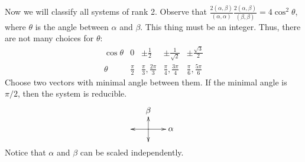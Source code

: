  Now we will classify all systems of rank 2. Observe that
 $\frac{2(\alpha,\beta)}{(\alpha,\alpha)}\frac{2(\alpha,\beta)}{(\beta,\beta)} =
 4\cos^2 \theta$, where $\theta$ is the angle between $\alpha$ and
 $\beta$. This thing must be an integer. Thus, there are not many choices for
 $\theta$:
 \[\begin{array}{c|ccccc}
   \cos \theta & 0 & \pm \frac{1}{2} & \pm \frac{1}{\sqrt{2}} & \pm
   \frac{\sqrt{3}}{2}\\ \hline
   \theta & \frac{\pi}{2} & \frac{\pi}{3}, \frac{2\pi}{3} & \frac{\pi}{4}, \frac{3\pi}{4}
   & \frac{\pi}{6},\frac{5\pi}{6}
 \end{array}\]
 Choose two vectors with minimal angle between them. If the minimal angle is $\pi/2$,
 then the system is reducible.
 \[\begin{xy}
   <1.5em,0em>:(0,0);
   \ar (1.4,0) *+!L{\alpha},
   \ar (-1.4,0),
   \ar (0,1) *+!D{\beta},
   \ar (0,-1),
 \end{xy}\]
 Notice that $\alpha$ and $\beta$ can be scaled independently.

